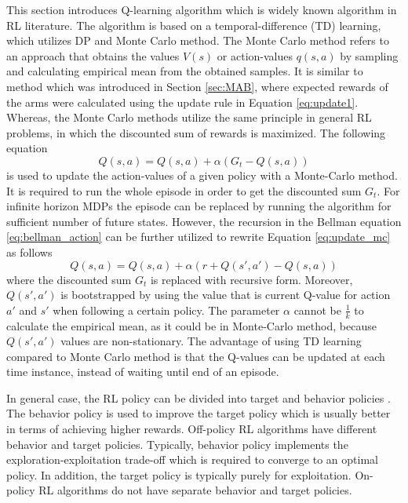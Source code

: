 \documentclass[english, 12pt, a4paper, elec, utf8, a-1b, online]{aaltothesis}
\begin{document}
This section introduces Q-learning algorithm which is widely known algorithm in RL literature. 
The algorithm is based on a temporal-difference (TD) learning, which utilizes DP and Monte Carlo method. 
The Monte Carlo method refers to an approach that obtains the values $V(s)$ or action-values $q(s, a)$ by sampling and calculating empirical mean from the obtained samples. 
It is similar to method which was introduced in Section \ref{sec:MAB}, where expected rewards of the arms were calculated using the update rule in Equation \eqref{eq:update1}. 
Whereas, the Monte Carlo methods utilize the same principle in general RL problems, in which the discounted sum of rewards is maximized. 
The following equation 
\begin{equation}\label{eq:update_mc}
    Q(s, a) = Q(s, a) + \alpha (G_t - Q(s, a))
\end{equation}
is used to update the action-values of a given policy with a Monte-Carlo method. 
It is required to run the whole episode in order to get the discounted sum $G_t$.
For infinite horizon MDPs the episode can be replaced by running the algorithm for sufficient number of future states.
However, the recursion in the Bellman equation \eqref{eq:bellman_action} can be further utilized to rewrite Equation \eqref{eq:update_mc} as follows 
\begin{equation}\label{eq:update_td}
    Q(s, a) = Q(s, a) + \alpha \left( r + Q(s', a') - Q(s, a) \right)
\end{equation}
where the discounted sum $G_t$ is replaced with recursive form.
Moreover, $Q(s', a')$ is bootstrapped by using the value that is current Q-value for action $a'$ and $s'$ when following a certain policy.
The parameter $\alpha$ cannot be $\frac{1}{k}$ to calculate the empirical mean, as it could be in Monte-Carlo method, because $Q(s', a')$ values are non-stationary.
The advantage of using TD learning compared to Monte Carlo method is that the Q-values can be updated at each time instance, instead of waiting until end of an episode.

In general case, the RL policy can be divided into target and behavior policies \cite{Sutton2018}.
The behavior policy is used to improve the target policy which is usually better in terms of achieving higher rewards.
Off-policy RL algorithms have different behavior and target policies.
Typically, behavior policy implements the exploration-exploitation trade-off which is required to converge to an optimal policy. 
In addition, the target policy is typically purely for exploitation. 
On-policy RL algorithms do not have separate behavior and target policies. 
\end{document}
